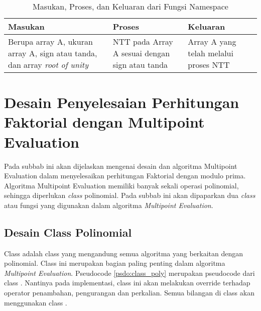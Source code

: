 \begin{table}[]	
	\Centering
	\begin{tabular}{|p{3cm}|p{3cm}|p{3cm}|}
	\hline
	Masukan & Proses & Keluaran \\ \hline
	Berupa array A, ukuran array A, sign atau tanda, dan array \textit{root of unity} & NTT pada Array A sesuai dengan sign atau tanda & Array A yang telah melalui proses NTT\\ \hline
	\end{tabular}
	\caption{Masukan, Proses, dan Keluaran dari Fungsi  Namespace }
	\label{tab:namespace_ntt_nttdit4}
\end{table}

\newpage

\section{Desain Penyelesaian Perhitungan Faktorial dengan Multipoint Evaluation}
Pada subbab ini akan dijelaskan mengenai desain dan algoritma Multipoint Evaluation dalam menyelesaikan perhitungan Faktorial dengan modulo prima. Algoritma Multipoint Evaluation memiliki banyak sekali operasi polinomial, sehingga diperlukan \textit{class} polinomial. Pada subbab ini akan dipaparkan dua \textit{class} atau fungsi yang digunakan dalam algoritma \textit{Multipoint Evaluation}.

\subsection{Desain Class Polinomial}
Class  adalah class yang mengandung semua algoritma yang berkaitan dengan polinomial. Class ini merupakan bagian paling penting dalam algoritma \textit{Multipoint Evaluation}. Pseudocode \ref{psdo:class_poly} merupakan pseudocode dari class . Nantinya pada implementasi, class ini akan melakukan override terhadap operator penambahan, pengurangan dan perkalian. Semua bilangan di class  akan menggunakan class .

